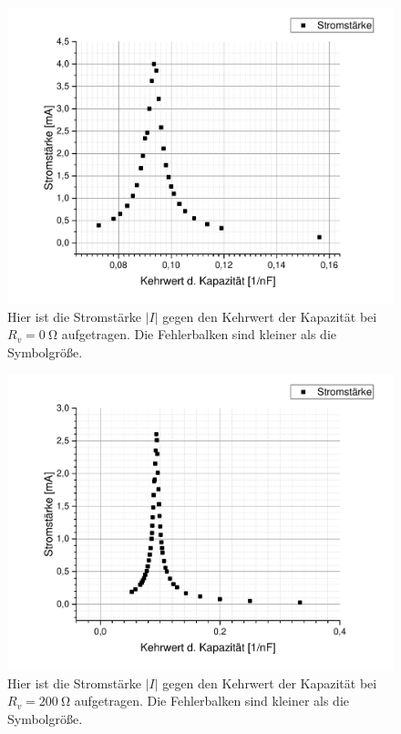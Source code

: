 \documentclass[
	a4paper,
	12pt,
	pagesize,
	ngerman
]{scrartcl}
\begin{document}
	\begin{figure}[H]
		\includegraphics[width=1\textwidth]{Serie_0}
		\centering
		\caption{Hier ist die Stromstärke $ \left| I \right| $ gegen den Kehrwert der Kapazität bei $ R_v = \SI{0}{\ohm} $ aufgetragen. Die Fehlerbalken sind kleiner als die Symbolgröße.}
		\label{Serie_0}
		\centering
	\end{figure} 
	\begin{figure}[H]
		\includegraphics[width=1\textwidth]{Serie_200}
		\centering
		\caption{Hier ist die Stromstärke $ \left| I \right| $ gegen den Kehrwert der Kapazität bei $ R_v = \SI{200}{\ohm} $ aufgetragen. Die Fehlerbalken sind kleiner als die Symbolgröße.}
		\label{Serie_200}
		\centering
	\end{figure} 
\end{document}
